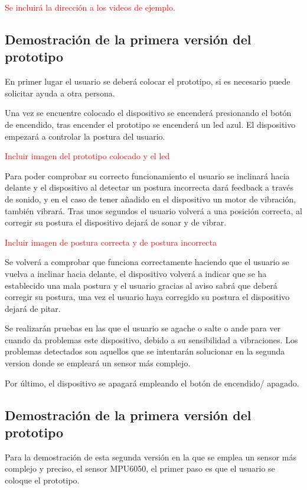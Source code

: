 \textcolor{red}{Se incluirá la dirección a los videos de ejemplo.}

\subsection{Demostración de la primera versión del prototipo}

En primer lugar el usuario se deberá colocar el prototipo, si es necesario puede solicitar ayuda a otra persona.

Una vez se encuentre colocado el dispositivo se encenderá presionando el botón de encendido, tras encender el prototipo se encenderá un led azul. El dispositivo empezará a controlar la postura del usuario.

\textcolor{red}{Incluir imagen del prototipo colocado y el led}

Para poder comprobar su correcto funcionamiento el usuario se inclinará hacia delante y el dispositivo al detectar un postura incorrecta dará feedback a través de sonido, y en el caso de tener añadido en el dispositivo un motor de vibración, también vibrará. Tras unos segundos el usuario volverá a una posición correcta, al corregir su postura el dispositivo dejará de sonar y de vibrar.

\textcolor{red}{Incluir imagen de postura correcta y de postura incorrecta}

Se volverá a comprobar que funciona correctamente haciendo que el usuario se vuelva a inclinar hacia delante, el dispositivo volverá a indicar que se ha establecido una mala postura y el usuario gracias al aviso sabrá que deberá corregir su postura, una vez el usuario haya corregido su postura el dispositivo dejará de pitar.

Se realizarán pruebas en las que el usuario se agache o salte o ande para ver cuando da problemas este dispositivo, debido a su sensibilidad a vibraciones. Los problemas detectados son aquellos que se intentarán solucionar en la segunda version donde se empleará un sensor más complejo.

Por último, el dispositivo se apagará empleando el botón de encendido/ apagado.


\subsection{Demostración de la primera versión del prototipo}

Para la demostración de esta segunda versión en la que se emplea un sensor más complejo y preciso, el sensor MPU6050\cite{MPU6050_1,MPU6050_2}, el primer paso es que el usuario se coloque el prototipo.

